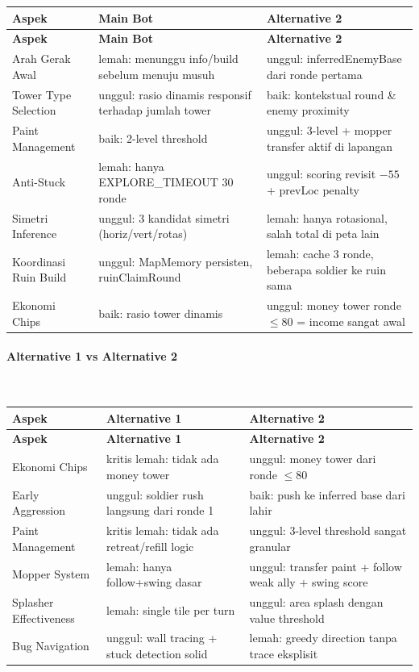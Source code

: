 \documentclass{article}
\begin{document}
\begin{enumerate}[label=\alph*.]
\begin{longtable}{|p{3cm}|p{5.5cm}|p{5.5cm}|}
\hline
\textbf{Aspek} & \textbf{Main Bot} & \textbf{Alternative 2} \\
\hline
\endfirsthead
\hline
\textbf{Aspek} & \textbf{Main Bot} & \textbf{Alternative 2} \\
\hline
\endhead
\hline
\endfoot
Arah Gerak Awal
& lemah: menunggu info/build sebelum menuju musuh
& unggul: inferredEnemyBase dari ronde pertama \\
\hline
Tower Type Selection
& unggul: rasio dinamis responsif terhadap jumlah tower
& baik: kontekstual round \& enemy proximity \\
\hline
Paint Management
& baik: 2-level threshold
& unggul: 3-level + mopper transfer aktif di lapangan \\
\hline
Anti-Stuck
& lemah: hanya EXPLORE\_TIMEOUT 30 ronde
& unggul: scoring revisit $-55$ + prevLoc penalty \\
\hline
Simetri Inference
& unggul: 3 kandidat simetri (horiz/vert/rotas)
& lemah: hanya rotasional, salah total di peta lain \\
\hline
Koordinasi Ruin Build
& unggul: MapMemory persisten, ruinClaimRound
& lemah: cache 3 ronde, beberapa soldier ke ruin sama \\
\hline
Ekonomi Chips
& baik: rasio tower dinamis
& unggul: money tower ronde $\leq$80 = income sangat awal \\
\hline
\end{longtable}

\medskip

\paragraph{Alternative 1 vs Alternative 2}
\mbox{}\\[2pt]

\begin{longtable}{|p{3cm}|p{5.5cm}|p{5.5cm}|}
\hline
\textbf{Aspek} & \textbf{Alternative 1} & \textbf{Alternative 2} \\
\hline
\endfirsthead
\hline
\textbf{Aspek} & \textbf{Alternative 1} & \textbf{Alternative 2} \\
\hline
\endhead
\hline
\endfoot
Ekonomi Chips
& kritis lemah: tidak ada money tower
& unggul: money tower dari ronde $\leq$80 \\
\hline
Early Aggression
& unggul: soldier rush langsung dari ronde 1
& baik: push ke inferred base dari lahir \\
\hline
Paint Management
& kritis lemah: tidak ada retreat/refill logic
& unggul: 3-level threshold sangat granular \\
\hline
Mopper System
& lemah: hanya follow+swing dasar
& unggul: transfer paint + follow weak ally + swing score \\
\hline
Splasher Effectiveness
& lemah: single tile per turn
& unggul: area splash dengan value threshold \\
\hline
Bug Navigation
& unggul: wall tracing + stuck detection solid
& lemah: greedy direction tanpa trace eksplisit \\
\hline
\end{longtable}


\end{enumerate}
\end{document}
